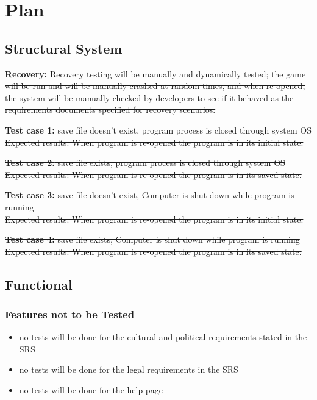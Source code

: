 \documentclass[12pt]{article}
\begin{document}
	
	\section{Plan}
	\subsection{Structural System}
    \sout{\textbf{Recovery: } Recovery testing will be manually and dynamically tested; the game will be run and will be manually crashed at random times, and when re-opened, the system will be manually checked by developers to see if it behaved as the requirements documents specified for recovery scenarios. }

	\sout{\textbf{Test case 1: }save file doesn’t exist, program process is closed through system OS
\\Expected results: When program is re-opened the program is in its initial state.}

	\sout{\textbf{Test case 2: }save file exists, program process is closed through system OS
\\Expected results: When program is re-opened the program is in its saved state.}

	\sout{\textbf{Test case 3: }save file doesn’t exist, Computer is shut down while program is running
\\Expected results: When program is re-opened the program is in its initial state.}

	\sout{\textbf{Test case 4: } save file exists, Computer is shut down while program is running
\\Expected results: When program is re-opened the program is in its saved state.}

	\subsection{Functional}
	\subsubsection{Features not to be Tested}
	\begin{itemize}
	\item no tests will be done for the cultural and political requirements stated in the SRS
	\item no tests will be done for the legal requirements in the SRS
	\item no tests will be done for the help page	
	\end{itemize}
	
\end{document}
